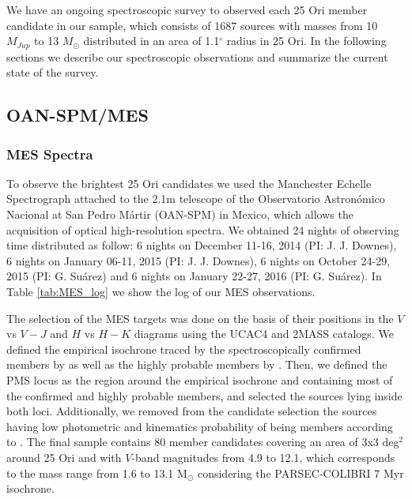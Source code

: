 \documentclass[12pt]{article}
\newcounter{subsubsubsection}[subsubsection]
\begin{document}
We have an ongoing spectroscopic survey to observed each 25 Ori member candidate in our sample, which consists of 1687 sources with masses from 10 $M_{Jup}$ to 13 $M_\odot$ distributed in an area of 1.1$^\circ$ radius in 25 Ori. In the following sections we describe our spectroscopic observations and summarize the current state of the survey.

\subsection{OAN-SPM/MES}
\label{sec:MES}

\subsubsection{MES Spectra}
\label{sec_echelle:spectra}
To observe the brightest 25 Ori candidates we used the Manchester Echelle Spectrograph \citep[MES; ][]{Meaburn1984,Meaburn2003} attached to the 2.1m telescope of the Observatorio Astron\'omico Nacional at San Pedro M\'artir (OAN-SPM) in Mexico, which allows the acquisition of optical high-resolution spectra. We obtained 24 nights of observing time distributed as follow: 6 nights on December 11-16, 2014 (PI: J. J. Downes), 6 nights on January 06-11, 2015 (PI: J. J. Downes), 6 nights on October 24-29, 2015 (PI: G. Su\'arez) and 6 nights on January 22-27, 2016 (PI: G. Su\'arez). In Table \ref{tab:MES_log} we show the log of our MES observations.

\label{sec_echelle:targets}
The selection of the MES targets was done on the basis of their positions in the $V$ vs $V-J$ and $H$ vs $H-K$ diagrams using the UCAC4 and 2MASS catalogs. We defined the empirical isochrone traced by the spectroscopically confirmed members by \citet{Briceno2005,Briceno2007,Downes2014} as well as the highly probable members by \citet{Kharchenko2005}. Then, we defined the PMS locus as the region around the empirical isochrone and containing most of the confirmed and highly probable members, and selected the sources lying inside both loci. Additionally, we removed from the candidate selection the sources having low photometric and kinematics probability of being members according to \citet{Kharchenko2005}. The final sample contains 80 member candidates covering an area of 3x3 deg$^2$ around 25 Ori and with $V$-band magnitudes from 4.9 to 12.1, which corresponds to the mass range from 1.6 to 13.1 M$_\odot$ considering the PARSEC-COLIBRI 7 Myr isochrone.
\end{document}
